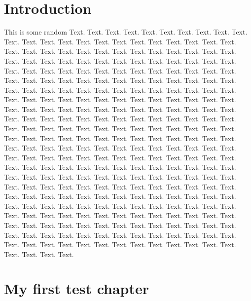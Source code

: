 \documentclass{book}
\begin{document}
\frontmatter

\chapter{Introduction}

This is some random Text. Text. Text. Text. Text. Text. Text. Text. Text. Text. Text. Text. Text. Text. Text. Text. Text. Text. Text. Text. Text. Text. Text. Text. Text. Text. Text. Text. Text. Text. Text. Text. Text. Text. Text. Text. Text. Text. Text. Text. Text. Text. Text. Text. Text. Text. Text. Text. Text. Text. Text. Text. Text. Text. Text. Text. Text. Text. Text. Text. Text. Text. Text. Text. Text. Text. Text. Text. Text. Text. Text. Text. Text. Text. Text. Text. Text. Text. Text. Text. Text. Text. Text. Text. Text. Text. Text. Text. Text. Text. Text. Text. Text. Text. Text. Text. Text. Text. Text. Text. Text. Text. Text. Text. Text. Text. Text. Text. Text. Text. Text. Text. Text. Text. Text. Text. Text. Text. Text. Text. Text. Text. Text. Text. Text. Text. Text. Text. Text. Text. Text. Text. Text. Text. Text. Text. Text. Text. Text. Text. Text. Text. Text. Text. Text. Text. Text. Text. Text. Text. Text. Text. Text. Text. Text. Text. Text. Text. Text. Text. Text. Text. Text. Text. Text. Text. Text. Text. Text. Text. Text. Text. Text. Text. Text. Text. Text. Text. Text. Text. Text. Text. Text. Text. Text. Text. Text. Text. Text. Text. Text. Text. Text. Text. Text. Text. Text. Text. Text. Text. Text. Text. Text. Text. Text. Text. Text. Text. Text. Text. Text. Text. Text. Text. Text. Text. Text. Text. Text. Text. Text. Text. Text. Text. Text. Text. Text. Text. Text. Text. Text. Text. Text. Text. Text. Text. Text. Text. Text. Text. Text. Text. Text. Text. Text. Text. Text. Text. Text. Text. Text. Text. Text. Text. Text. Text. Text. Text. Text. Text. Text. Text. Text. Text. Text. Text. Text. Text. Text. Text. Text. Text. Text. Text. Text. Text. Text. Text. Text. Text. Text. Text. Text. Text. Text. Text. Text. Text. Text. Text. Text. Text. Text. Text. Text. Text. Text. Text. Text. Text.


\tableofcontents

\mainmatter

\chapter{My first test chapter}
\end{document}
